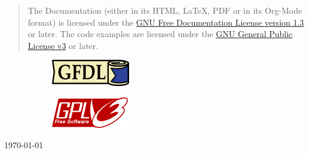 \begin{titlepage}
\begin{center}
        \vspace{1cm}
        
        \begin{quote}
          { \small
          The Documentation (either in its HTML, \LaTeX, PDF or in its Org-Mode format) is licensed under the
          \href{https://www.gnu.org/licenses/fdl-1.3.txt}{GNU Free Documentation License version 1.3}
          or later.  The code examples are licensed under the
          \href{https://www.gnu.org/licenses/gpl-3.0.txt}{GNU General Public License v3}
          or later.
          }
        \end{quote}

        \begin{figure}[!hbt]
          \centering
          \begin{subfigure}{0.49\textwidth}
            \centering
            \includegraphics[height=.5cm]{images/gfdl.png}
            \label{fig:left1}
          \end{subfigure}
          \begin{subfigure}{0.49\textwidth}
            \centering
            \includegraphics[height=.5cm]{images/gplv3.png}
            \label{fig:right1}
          \end{subfigure}
          \label{fig:combined1}
        \end{figure}

        \vfill
        
        {\large \date \to \today}
    \end{center}
\end{titlepage}
